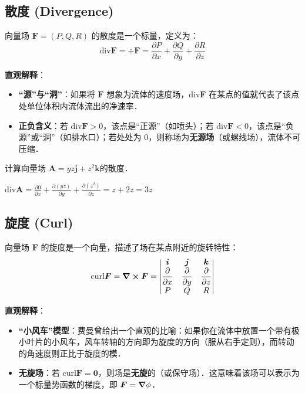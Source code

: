 \documentclass[12pt, a4paper, oneside, UTF8]{ctexbook}
\begin{document}
\subsection{散度 (Divergence)}
\begin{definition}
    向量场 $\bm{F} = (P,Q,R)$ 的散度是一个标量，定义为：
    \[ \text{div} \bm{F} = \div \bm{F} = \frac{\partial P}{\partial x} + \frac{\partial Q}{\partial y} + \frac{\partial R}{\partial z} \]
\end{definition}
\textbf{直观解释}：
\begin{itemize}
    \item \textbf{“源”与“洞”}：如果将 $\bm{F} $ 想象为流体的速度场，$\text{div} \bm{F} $ 在某点的值就代表了该点处单位体积内流体流出的净速率．
    \item \textbf{正负含义}：若 $\text{div} \bm{F}  > 0$，该点是“正源”（如喷头）；若 $\text{div} \bm{F}  < 0$，该点是“负源”或“洞”（如排水口）；若处处为 $0$，则称场为\textbf{无源场}（或螺线场），流体不可压缩．
\end{itemize}
\begin{example}
    计算向量场 $\bm{A} = yz \bm{j}+z^2\bm{k}$的散度． 
\end{example}
\begin{solution}
    $\text{div} \bm{A} = \frac{\partial 0}{\partial x} + \frac{\partial (yz)}{\partial y} + \frac{\partial (z^2)}{\partial z} = z + 2z = \boxed{3z}$
\end{solution}
\subsection{旋度 (Curl)}
\begin{definition}
    向量场 $\bm{F}$ 的旋度是一个向量，描述了场在某点附近的旋转特性：
    \[ \text{curl} \bm{F} = \curl \bm{F} = \begin{vmatrix} \bm{i} & \bm{j} & \bm{k} \\ \dfrac{\partial}{\partial x} & \dfrac{\partial}{\partial y} & \dfrac{\partial}{\partial z} \\ P & Q & R \end{vmatrix} \]
\end{definition}
\textbf{直观解释}：
\begin{itemize}
    \item \textbf{“小风车”模型}：费曼曾给出一个直观的比喻：如果你在流体中放置一个带有极小叶片的小风车，风车转轴的方向即为旋度的方向（服从右手定则），而转动的角速度则正比于旋度的模．
    \item \textbf{无旋场}：若 $\text{curl} \bm{F} = \bm{0}$，则场是\textbf{无旋}的（或保守场）．这意味着该场可以表示为一个标量势函数的梯度，即 $\bm{F} = \grad \phi$．
\end{itemize}
\end{document}
